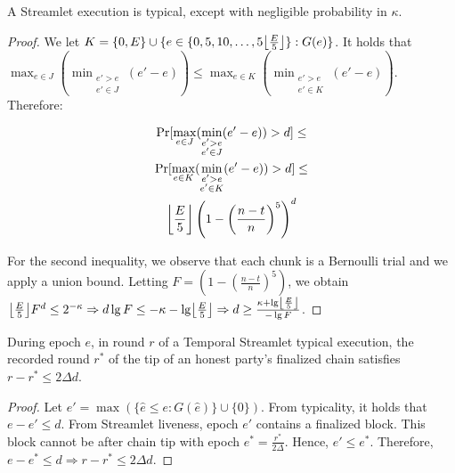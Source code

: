 \begin{lemma} \label{lem:honest-quintuple}
  A Streamlet execution is typical, except with negligible probability in $\kappa$.
\end{lemma}
\begin{proof}
  We let $K = \{0, E\} \cup \{e \in \{0, 5, 10 ,\ldots, 5\floor*{\frac{E}{5}}\}: G(e)\}$.
  It holds that
  $\max_{e \in J}(\min_{\substack{e' > e \\ e' \in J}}(e' - e)) \leq \max_{e \in K}(\min_{\substack{e' > e \\ e' \in K}}(e' - e))$.
  Therefore:

  \begin{gather*}
      \Pr [\max_{e \in J}(\min_{\substack{e' > e \\ e' \in J}}(e' - e)) > d] \leq \\
      \Pr [\max_{e \in K}(\min_{\substack{e' > e \\ e' \in K}}(e' - e)) > d] \leq \\
      \floor*{\frac{E}{5}} \left(1 - \left(\frac{n - t}{n}\right)^5\right)^d
  \end{gather*}

  For the second inequality, we observe that each chunk is a Bernoulli trial and we
  apply a union bound.
  Letting $F = \left(1 - \left(\frac{n - t}{n}\right)^5\right)$, we obtain
  $\floor*{\frac{E}{5}} F^d \leq 2^{-\kappa} \Rightarrow
   d \lg F \leq -\kappa - \lg \floor*{\frac{E}{5}} \Rightarrow
   d \geq \frac{\kappa + \lg \floor*{\frac{E}{5}}}{- \lg F}
  $.
  \Qed
\end{proof}

\begin{lemma} \label{lem:latest-finalized-round}
  During epoch $e$, in round $r$ of a Temporal Streamlet typical execution,
  the recorded round $r^*$ of the tip of an honest party's finalized chain
  satisfies $r - r^* \leq 2\Delta d$.
\end{lemma}
\begin{proof}
  Let $e' = \max(\{\hat e \leq e: G(\hat e)\} \cup \{0\})$.
  From typicality, it holds that $e - e' \leq d$.
  From Streamlet liveness, epoch $e'$ contains a finalized
  block. This block cannot be after chain tip with epoch $e^* = \frac{r^*}{2\Delta}$.
  Hence, $e' \leq e^*$. Therefore, $e - e^* \leq d \Rightarrow r - r^* \leq 2\Delta d$.
  \Qed
\end{proof}


